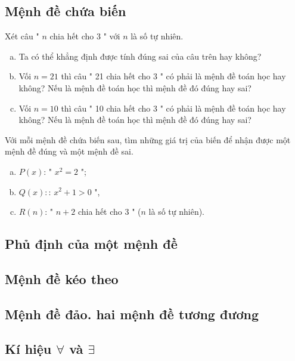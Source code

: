 \documentclass[Main.tex]{subfiles}
\begin{document}
\subsection{Mệnh đề chứa biến}
	\begin{hd}
		Xét câu " $n$ chia hết cho 3 " với $n$ là số tự nhiên.
		\begin{enumerate}[a)]
			\item  Ta có thể khẳng định được tính đúng sai của câu trên hay không?
			\item  Vối $n=21$ thì câu " 21 chia hết cho 3 " có phải là mệnh đề toán học hay không? Nếu là mệnh đề toán học thì mệnh đề đó đúng hay sai?
			\item  Vối $n=10$ thì câu " 10 chia hết cho 3 " có phải là mệnh đề toán học hay không? Nếu là mệnh đề toán học thì mệnh đề đó đúng hay sai?
		\end{enumerate}
	\end{hd}
	\begin{hd}
		Với mỗi mệnh đề chứa biến sau, tìm những giá trị của biến để nhận được một mệnh đề đúng và một mệnh đề sai.
		\begin{enumerate}[a)]
			\item  $P(x)$: " $x^2=2$ ";
			\item  $Q(x):$: $x^2+1>0$ ",
			\item  $R(n)$: " $n+2$ chia hết cho 3 " ($n$ là số tự nhiên).
		\end{enumerate}
	\end{hd}
\subsection{Phủ định của một mệnh đề}
\subsection{Mệnh đề kéo theo}
\subsection{Mệnh đề đảo. hai mệnh đề tương đương}
\subsection{Kí hiệu $\forall$ và $\exists$}
\end{document}
